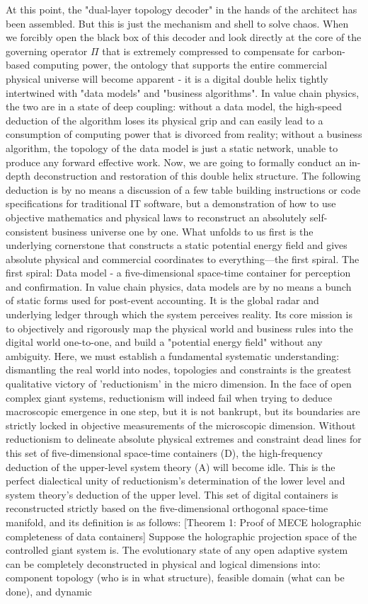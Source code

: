 \documentclass[11pt,a4paper]{article}
\begin{document}
At this point, the "dual-layer topology decoder" in the hands of the architect has been assembled. But this is just the mechanism and shell to solve chaos. When we forcibly open the black box of this decoder and look directly at the core of the governing operator $\Pi$ that is extremely compressed to compensate for carbon-based computing power, the ontology that supports the entire commercial physical universe will become apparent - it is a digital double helix tightly intertwined with "data models" and "business algorithms". In value chain physics, the two are in a state of deep coupling: without a data model, the high-speed deduction of the algorithm loses its physical grip and can easily lead to a consumption of computing power that is divorced from reality; without a business algorithm, the topology of the data model is just a static network, unable to produce any forward effective work. Now, we are going to formally conduct an in-depth deconstruction and restoration of this double helix structure. The following deduction is by no means a discussion of a few table building instructions or code specifications for traditional IT software, but a demonstration of how to use objective mathematics and physical laws to reconstruct an absolutely self-consistent business universe one by one. What unfolds to us first is the underlying cornerstone that constructs a static potential energy field and gives absolute physical and commercial coordinates to everything—the first spiral. The first spiral: Data model - a five-dimensional space-time container for perception and confirmation. In value chain physics, data models are by no means a bunch of static forms used for post-event accounting. It is the global radar and underlying ledger through which the system perceives reality. Its core mission is to objectively and rigorously map the physical world and business rules into the digital world one-to-one, and build a "potential energy field" without any ambiguity. Here, we must establish a fundamental systematic understanding: dismantling the real world into nodes, topologies and constraints is the greatest qualitative victory of 'reductionism' in the micro dimension. In the face of open complex giant systems, reductionism will indeed fail when trying to deduce macroscopic emergence in one step, but it is not bankrupt, but its boundaries are strictly locked in objective measurements of the microscopic dimension. Without reductionism to delineate absolute physical extremes and constraint dead lines for this set of five-dimensional space-time containers (D), the high-frequency deduction of the upper-level system theory (A) will become idle. This is the perfect dialectical unity of reductionism’s determination of the lower level and system theory’s deduction of the upper level. This set of digital containers is reconstructed strictly based on the five-dimensional orthogonal space-time manifold, and its definition is as follows: [Theorem 1: Proof of MECE holographic completeness of data containers] Suppose the holographic projection space of the controlled giant system is. The evolutionary state of any open adaptive system can be completely deconstructed in physical and logical dimensions into: component topology (who is in what structure), feasible domain (what can be done), and dynamic 
\end{document}
